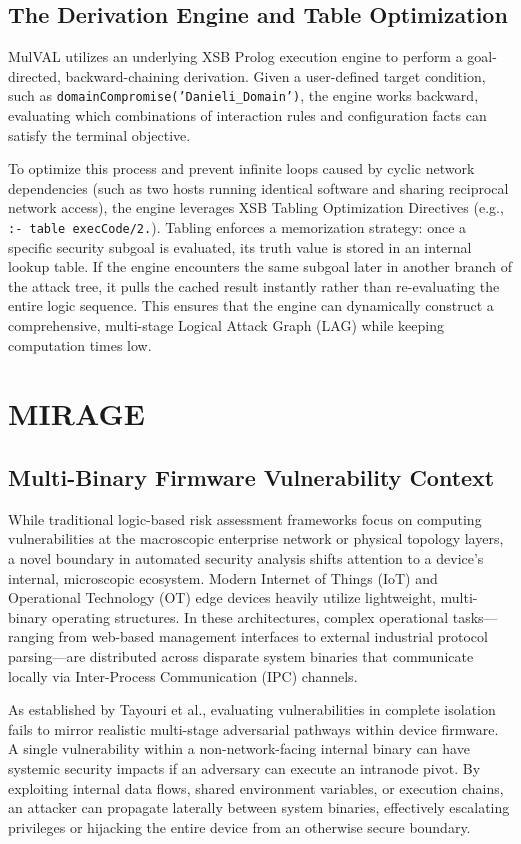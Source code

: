 \documentclass[target=mst,aauheader=aics,style=]{thud}
\begin{document}
\subsection{The Derivation Engine and Table Optimization}
MulVAL utilizes an underlying XSB Prolog execution engine to perform a goal-directed, backward-chaining derivation. Given a user-defined target condition, such as \texttt{domainCompromise('Danieli\_Domain')}, the engine works backward, evaluating which combinations of interaction rules and configuration facts can satisfy the terminal objective.

To optimize this process and prevent infinite loops caused by cyclic network dependencies (such as two hosts running identical software and sharing reciprocal network access), the engine leverages XSB Tabling Optimization Directives (e.g., \texttt{:- table execCode/2.}). Tabling enforces a memorization strategy: once a specific security subgoal is evaluated, its truth value is stored in an internal lookup table. If the engine encounters the same subgoal later in another branch of the attack tree, it pulls the cached result instantly rather than re-evaluating the entire logic sequence. This ensures that the engine can dynamically construct a comprehensive, multi-stage Logical Attack Graph (LAG) while keeping computation times low.

\section{MIRAGE}

\subsection{Multi-Binary Firmware Vulnerability Context}
While traditional logic-based risk assessment frameworks focus on computing vulnerabilities at the macroscopic enterprise network or physical topology layers, a novel boundary in automated security analysis shifts attention to a device’s internal, microscopic ecosystem. Modern Internet of Things (IoT) and Operational Technology (OT) edge devices heavily utilize lightweight, multi-binary operating structures. In these architectures, complex operational tasks—ranging from web-based management interfaces to external industrial protocol parsing—are distributed across disparate system binaries that communicate locally via Inter-Process Communication (IPC) channels. 

As established by Tayouri et al., evaluating vulnerabilities in complete isolation fails to mirror realistic multi-stage adversarial pathways within device firmware. A single vulnerability within a non-network-facing internal binary can have systemic security impacts if an adversary can execute an intranode pivot. By exploiting internal data flows, shared environment variables, or execution chains, an attacker can propagate laterally between system binaries, effectively escalating privileges or hijacking the entire device from an otherwise secure boundary. 
\end{document}

